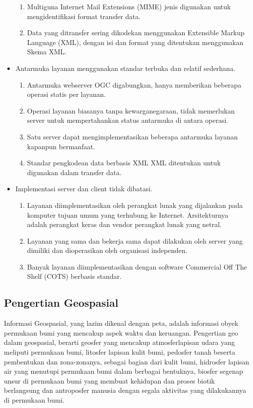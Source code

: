 \begin{itemize}
\begin{enumerate}
\item Multiguna Internet Mail Extensions (MIME) jenis digunakan untuk mengidentifikasi format transfer data.
\item Data yang ditransfer sering dikodekan menggunakan Extensible Markup Language (XML), dengan isi dan format yang ditentukan menggunakan Skema XML.
\end{enumerate}
\item Antarmuka layanan menggunakan standar terbuka dan relatif sederhana.
\begin{enumerate}
\item Antarmuka webserver OGC digabungkan, hanya memberikan beberapa operasi statis per layanan.
\item Operasi layanan biasanya tanpa kewarganegaraan, tidak memerlukan server untuk mempertahankan status antarmuka di antara operasi.
\item Satu server dapat mengimplementasikan beberapa antarmuka layanan kapanpun bermanfaat.
\item Standar pengkodean data berbasis XML XML ditentukan untuk digunakan dalam transfer data.
\end{enumerate}
\item Implementasi server dan client tidak dibatasi.
\begin{enumerate}
\item Layanan diimplementasikan oleh perangkat lunak yang dijalankan pada komputer tujuan umum yang terhubung ke Internet. Arsitekturnya adalah perangkat keras dan vendor perangkat lunak yang netral.
\item Layanan yang sama dan bekerja sama dapat dilakukan oleh server yang dimiliki dan dioperasikan oleh organisasi independen. 
\item Banyak layanan diimplementasikan dengan software Commercial Off The Shelf (COTS) berbasis standar\cite{lupp2008open}.
\end{enumerate}
\end{itemize}
\subsection{Pengertian Geospasial} 
Informasi Geospasial, yang lazim dikenal dengan peta, adalah informasi
obyek permukaan bumi yang mencakup aspek waktu dan keruangan. Pengertian
geo dalam geospasial, berarti geosfer yang mencakup atmosferlapisan udara
yang meliputi permukaan bumi, litosfer lapisan kulit bumi, pedosfer tanah
beserta pembentukan dan zona-zonanya, sebagai bagian dari kulit bumi,
hidrosfer lapisan air yang menutupi permukaan bumi dalam berbagai bentuknya,
biosfer segenap unsur di permukaan bumi yang membuat kehidupan dan proses
biotik berlangsung dan antroposfer manusia dengan segala aktivitas yang
dilakukannya di permukaan bumi.

